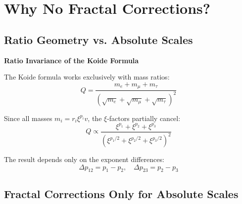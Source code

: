 	\section{Why No Fractal Corrections?}
	
	\subsection{Ratio Geometry vs. Absolute Scales}
	
	\begin{theorem}
		\textbf{Ratio Invariance of the Koide Formula}
		
		The Koide formula works exclusively with mass ratios:
		\begin{equation}
			Q = \frac{m_e + m_\mu + m_\tau}{(\sqrt{m_e} + \sqrt{m_\mu} + \sqrt{m_\tau})^2}
		\end{equation}
		
		Since all masses $m_i = r_i \xi^{p_i} v$, the $\xi$-factors partially cancel:
		\begin{equation}
			Q \propto \frac{\xi^{p_1} + \xi^{p_2} + \xi^{p_3}}{(\xi^{p_1/2} + \xi^{p_2/2} + \xi^{p_3/2})^2}
		\end{equation}
		
		The result depends only on the exponent differences:
		\begin{equation}
			\Delta p_{12} = p_1 - p_2, \quad \Delta p_{23} = p_2 - p_3
		\end{equation}
	\end{theorem}
	
	\subsection{Fractal Corrections Only for Absolute Scales}
	
	\begin{table}[h]
		\centering
		\caption{Necessity of Fractal Corrections}
	\end{table}
	
